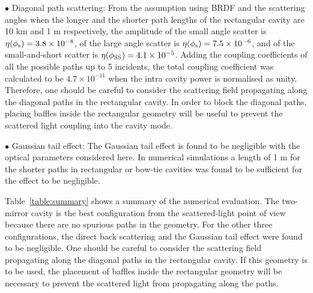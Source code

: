 $\bullet$ Diagonal path scattering:
From the assumption using BRDF and the scattering angles
when the longer and the shorter path lengths of the rectangular cavity
are 10 km and 1 m respectively,
the amplitude of the small angle scatter is
$\eta (\phi _{\rm s})=3.8 \times 10^{-8}$,
of the large angle scatter is $\eta (\phi _{\rm s})=7.5 \times 10^{-6}$,
and of the small-and-short scatter is $\eta (\phi _{\rm SS})=4.1 \times 10^{-5}$.
Adding the coupling coefficients of all the possible paths
up to 5 incidents, the total coupling coefficient was calculated
to be $4.7 \times 10^{-11}$ when the intra cavity power is normalised as unity.
Therefore, one should be careful to consider the scattering field propagating
along the diagonal paths in the rectangular cavity.
In order to block the diagonal paths, placing baffles
inside the rectangular geometry will be useful
to prevent the scattered light coupling into the cavity mode.


$\bullet$ Gaussian tail effect:
The Gaussian tail effect is found to be negligible
with the optical parameters considered here.
In numerical simulations a length of 1 m for the shorter paths
in rectangular or bow-tie cavities was found to be sufficient
for the effect to be negligible.


Table~\ref{table:summary} shows a summary of the numerical evaluation.
The two-mirror cavity is the best configuration from the scattered-light
point of view because there are no spurious paths in the geometry.
For the other three configurations,
the direct back scattering and the Gaussian tail effect were found to be negligible.
One should be careful to consider the scattering field propagating
along the diagonal paths in the rectangular cavity.
If this geometry is to be used, the placement of baffles
inside the rectangular geometry will be necessary
to prevent the scattered light from propagating along the paths.




